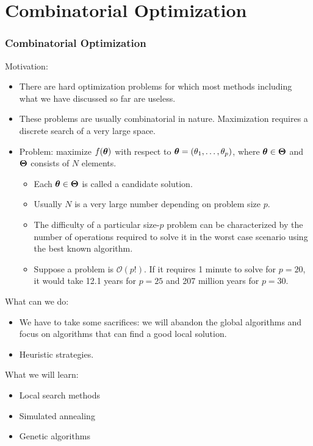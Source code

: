 \section{Combinatorial Optimization}


\begin{frame}
  \frametitle{Combinatorial Optimization}
  Motivation:
  \begin{itemize}
    \item There are hard optimization problems for which most methods including what we have discussed so far are useless.
    \item These problems are usually combinatorial in nature. Maximization requires a discrete search of a very large space.
    \item Problem: maximize $f(\boldsymbol{\theta})$ with respect to $\boldsymbol{\theta}=(\theta_1,\ldots,\theta_p)$, where $\boldsymbol{\theta} \in \boldsymbol{\Theta}$ and $\boldsymbol{\Theta}$ consists of $N$ elements.
        \begin{itemize}
            \item Each $\boldsymbol{\theta}\in \boldsymbol{\Theta}$ is called a candidate solution.
            \item Usually $N$ is a very large number depending on problem size $p$.
            \item The difficulty of a particular size-$p$ problem can be characterized by the number of operations required to solve it in the worst case scenario using the best known algorithm.
            \item Suppose a problem is $\mathcal{O}(p!)$. If it requires 1 minute to solve for $p=20$, it would take 12.1 years for $p=25$ and 207 million years for $p=30$.
        \end{itemize}
  \end{itemize}

\end{frame}
  


\begin{frame}
  What can we do:
  \begin{itemize}
  \item We have to take some sacrifices: we will abandon the global algorithms and focus on algorithms that can find a good local solution.
  \item Heuristic strategies.
  \end{itemize}
  What we will learn:
  \begin{itemize}
  \item Local search methods
  \item Simulated annealing
  \item Genetic algorithms
  \end{itemize}
\end{frame}

